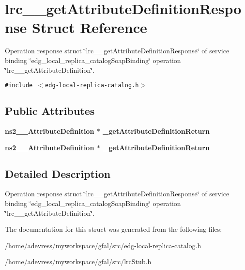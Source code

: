 \section{lrc\_\-\_\-get\-Attribute\-Definition\-Response Struct Reference}
\label{structlrc____getAttributeDefinitionResponse}
Operation response struct \char`\"{}lrc\_\-\_\-get\-Attribute\-Definition\-Response\char`\"{} of service binding \char`\"{}edg\_\-local\_\-replica\_\-catalog\-Soap\-Binding\char`\"{} operation \char`\"{}lrc\_\-\_\-get\-Attribute\-Definition\char`\"{}.  


{\tt \#include $<$edg-local-replica-catalog.h$>$}

\subsection*{Public Attributes}
\begin{CompactItemize}
\item 
\bf{ns2\_\-\_\-Attribute\-Definition} $\ast$ \textbf{\_\-get\-Attribute\-Definition\-Return}\label{structlrc____getAttributeDefinitionResponse_91dc1be1aca2d3d5aeda754196feddca}

\item 
\bf{ns2\_\-\_\-Attribute\-Definition} $\ast$ \textbf{\_\-get\-Attribute\-Definition\-Return}\label{structlrc____getAttributeDefinitionResponse_91dc1be1aca2d3d5aeda754196feddca}

\end{CompactItemize}


\subsection{Detailed Description}
Operation response struct \char`\"{}lrc\_\-\_\-get\-Attribute\-Definition\-Response\char`\"{} of service binding \char`\"{}edg\_\-local\_\-replica\_\-catalog\-Soap\-Binding\char`\"{} operation \char`\"{}lrc\_\-\_\-get\-Attribute\-Definition\char`\"{}. 



The documentation for this struct was generated from the following files:\begin{CompactItemize}
\item 
/home/adevress/myworkspace/gfal/src/edg-local-replica-catalog.h\item 
/home/adevress/myworkspace/gfal/src/lrc\-Stub.h\end{CompactItemize}
